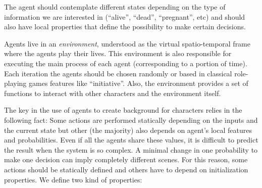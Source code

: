 \documentclass[letterpaper]{article}
\begin{document}


The agent should contemplate different states depending on the type of information we are interested in (``alive'', ``dead'', ``pregnant'', etc) and should also have local properties that define the possibility to make certain decisions.



Agents live in an {\em environment}, understood as the virtual spatio-temporal frame where the agents play their lives. This environment is also responsible for executing the main process of each agent (corresponding to a portion of time). Each iteration the agents should be chosen randomly or based in classical role-playing games features like ``initiative''. Also, the environment provides a set of functions to interact with other characters and the environment itself.




The key in the use of agents to create background for characters relies in the following fact: Some actions are performed statically depending on the inputs and the current state but other (the majority) also depends on agent's local features and probabilities. Even if all the agents share these values, it is difficult to predict the result when the system is so complex. A minimal change in one probability to make one decision can imply completely different scenes.
For this reason, some actions should be statically defined and others have to depend on initialization properties. We define two kind of properties:
\end{document}
